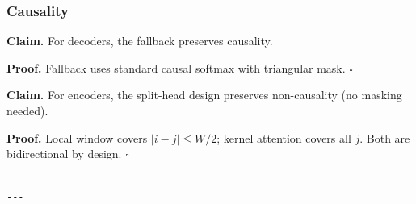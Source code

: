 \subsubsection{Causality}

\textbf{Claim.} For decoders, the fallback preserves causality.

\textbf{Proof.} Fallback uses standard causal softmax with triangular mask. $\square$

\textbf{Claim.} For encoders, the split-head design preserves non-causality 
(no masking needed).

\textbf{Proof.} Local window covers $|i - j| \leq W/2$; kernel attention covers 
all $j$. Both are bidirectional by design. $\square$
\begin{lstlisting}

---
\end{lstlisting}